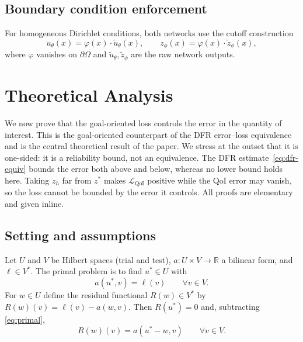 \documentclass[preprint,11pt]{elsarticle}
\newcommand{\R}{\mathbb{R}}
\begin{document}
\subsection{Boundary condition enforcement}

For homogeneous Dirichlet conditions, both networks use the cutoff construction
\begin{equation}
    u_\theta(x) = \varphi(x) \cdot \tilde{u}_\theta(x), \qquad
    z_\phi(x) = \varphi(x) \cdot \tilde{z}_\phi(x),
\end{equation}
where $\varphi$ vanishes on $\partial\Omega$ and $\tilde{u}_\theta, \tilde{z}_\phi$ are the raw network outputs.

\section{Theoretical Analysis}
\label{sec:theory}

We now prove that the goal-oriented loss controls the error in the quantity of interest. This is the goal-oriented counterpart of the DFR error--loss equivalence~\citep{taylor2023deep} and is the central theoretical result of the paper. We stress at the outset that it is one-sided: it is a reliability bound, not an equivalence. The DFR estimate~\eqref{eq:dfr-equiv} bounds the error both above and below, whereas no lower bound holds here. Taking $z_h$ far from $z^*$ makes $\mathcal{L}_{\mathrm{QoI}}$ positive while the QoI error may vanish, so the loss cannot be bounded by the error it controls. All proofs are elementary and given inline.

\subsection{Setting and assumptions}

Let $U$ and $V$ be Hilbert spaces (trial and test), $a : U \times V \to \R$ a bilinear form, and $\ell \in V^*$. The primal problem is to find $u^* \in U$ with
\begin{equation}
  \label{eq:primal}
  a(u^*, v) = \ell(v) \qquad \forall v \in V.
\end{equation}
For $w \in U$ define the residual functional $R(w) \in V^*$ by $R(w)(v) = \ell(v) - a(w,v)$. Then $R(u^*) = 0$ and, subtracting \eqref{eq:primal},
\begin{equation}
  \label{eq:res-galerkin}
  R(w)(v) = a(u^* - w, v) \qquad \forall v \in V .
\end{equation}
\end{document}
